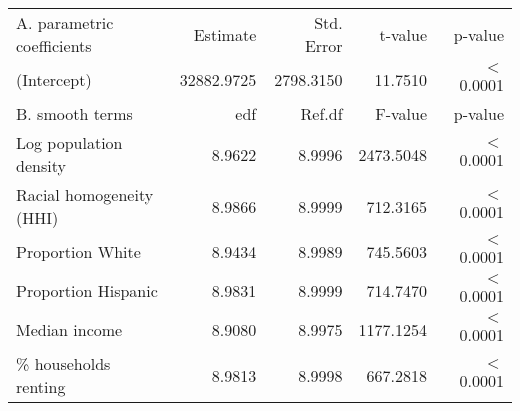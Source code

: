 \begin{table}[ht]
\centering
\begin{tabular}{lrrrr}
   \hline
A. parametric coefficients & Estimate & Std. Error & t-value & p-value \\ 
  (Intercept) & 32882.9725 & 2798.3150 & 11.7510 & $<$ 0.0001 \\ 
   \hline
B. smooth terms & edf & Ref.df & F-value & p-value \\ 
  Log population density & 8.9622 & 8.9996 & 2473.5048 & $<$ 0.0001 \\ 
  Racial homogeneity (HHI) & 8.9866 & 8.9999 & 712.3165 & $<$ 0.0001 \\ 
  Proportion White & 8.9434 & 8.9989 & 745.5603 & $<$ 0.0001 \\ 
  Proportion Hispanic & 8.9831 & 8.9999 & 714.7470 & $<$ 0.0001 \\ 
  Median income & 8.9080 & 8.9975 & 1177.1254 & $<$ 0.0001 \\ 
  \% households renting & 8.9813 & 8.9998 & 667.2818 & $<$ 0.0001 \\ 
   \hline
\end{tabular}
\caption{ } 
\label{Demographic GAM}
\end{table}

